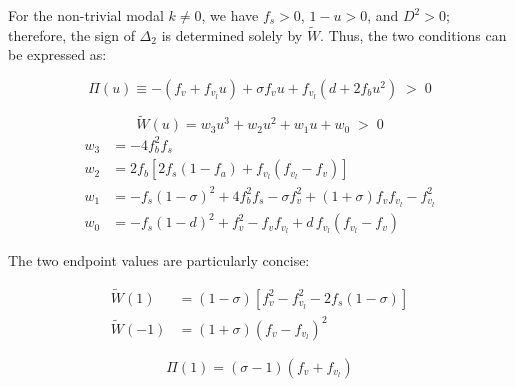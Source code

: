 \documentclass[11pt,a4paper,openany]{book}
\numberwithin{equation}{chapter}
\numberwithin{figure}{chapter}
\numberwithin{table}{chapter}
\begin{document}
For the non-trivial modal $k\ne0$, we have $f_s>0$, $1-u>0$, and $D^2>0$; therefore, the sign of $\Delta_2$ is determined solely by $\widetilde W$. Thus, the two conditions can be expressed as:










\begin{tcolorbox}[keybox,title=\textbf{Condition I}]
\begin{equation}
\Pi(u) \equiv -\left(f_v + f_{v_l}u\right) + \sigma f_v u + f_{v_l}\left(d + 2f_b u^2\right) \;>\; 0
\label{eq:Pi-bilateral}
\end{equation}
\end{tcolorbox}

\begin{tcolorbox}[keybox,title=\textbf{Condition II}]
\begin{equation}
\widetilde W(u) = w_3u^3 + w_2u^2 + w_1u + w_0 \;>\; 0
\label{eq:Wpoly-bilateral}
\end{equation}
\begin{align}
w_3 &= -4f_b^2 f_s \\
w_2 &= 2f_b\left[2f_s\left(1-f_a\right) + f_{v_l}\left(f_{v_l}-f_v\right)\right] \\
w_1 &= -f_s\left(1-\sigma\right)^2 + 4f_b^2f_s - \sigma f_v^2 + \left(1+\sigma\right)f_vf_{v_l} - f_{v_l}^2 \\
w_0 &= -f_s\left(1-d\right)^2 + f_v^2 - f_vf_{v_l} + d\,f_{v_l}\left(f_{v_l}-f_v\right)
\label{eq:Wcoeff-bilateral}
\end{align}
\end{tcolorbox}










The two endpoint values are particularly concise:

\begin{align}
\widetilde W(1) &= \left(1-\sigma\right)\left[f_v^2 - f_{v_l}^2 - 2f_s\left(1-\sigma\right)\right]
\label{eq:W1}\\
\widetilde W(-1) &= \left(1+\sigma\right)\left(f_v-f_{v_l}\right)^2
\end{align}

\begin{equation}
\Pi(1) = \left(\sigma-1\right)\left(f_v+f_{v_l}\right)
\end{equation}
\end{document}
